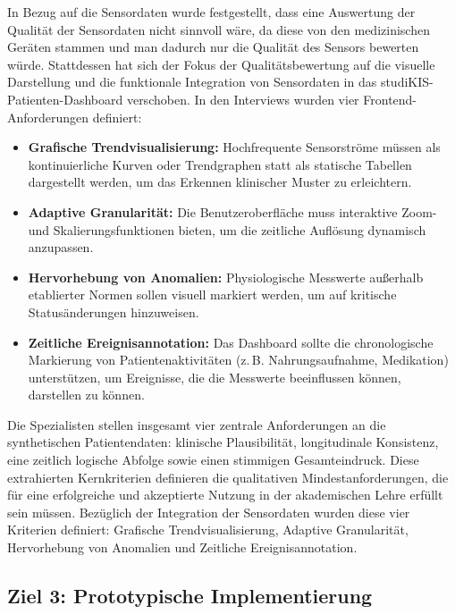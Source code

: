 \begin{description}[style=nextline, font=\bfseries]
    In Bezug auf die Sensordaten wurde festgestellt, dass eine Auswertung der Qualität der Sensordaten nicht sinnvoll wäre, da diese von den medizinischen Geräten stammen und man dadurch nur die Qualität des Sensors bewerten würde. Stattdessen hat sich der Fokus der Qualitätsbewertung auf die visuelle Darstellung und die funktionale Integration von Sensordaten in das studiKIS-Patienten-Dashboard verschoben. In den Interviews wurden vier Frontend-Anforderungen definiert:
    
    \begin{itemize}
    \item \textbf{Grafische Trendvisualisierung:} Hochfrequente Sensorströme müssen als kontinuierliche Kurven oder Trendgraphen statt als statische Tabellen dargestellt werden, um das Erkennen klinischer Muster zu erleichtern.
    \item \textbf{Adaptive Granularität:} Die Benutzeroberfläche muss interaktive Zoom- und Skalierungsfunktionen bieten, um die zeitliche Auflösung dynamisch anzupassen.
    \item \textbf{Hervorhebung von Anomalien:} Physiologische Messwerte außerhalb etablierter Normen sollen visuell markiert werden, um auf kritische Statusänderungen hinzuweisen.
    \item \textbf{Zeitliche Ereignisannotation:} Das Dashboard sollte die chronologische Markierung von Patientenaktivitäten (z.\,B. Nahrungsaufnahme, Medikation) unterstützen, um Ereignisse, die die Messwerte beeinflussen können, darstellen zu können.
    \end{itemize}

    \item[Beantwortung] 
    Die Spezialisten stellen insgesamt vier zentrale Anforderungen an die synthetischen Patientendaten: klinische Plausibilität, longitudinale Konsistenz, eine zeitlich logische Abfolge sowie einen stimmigen Gesamteindruck. Diese extrahierten Kernkriterien definieren die qualitativen Mindestanforderungen, die für eine erfolgreiche und akzeptierte Nutzung in der akademischen Lehre erfüllt sein müssen. Bezüglich der Integration der Sensordaten wurden diese vier Kriterien definiert: Grafische Trendvisualisierung, Adaptive Granularität, Hervorhebung von Anomalien und Zeitliche Ereignisannotation.

\end{description}

\subsection{Ziel 3: Prototypische Implementierung}

